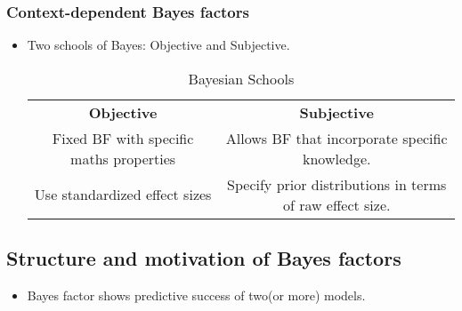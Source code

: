 \documentclass[a4paper]{article}
\begin{document}
\subsubsection{Context-dependent Bayes factors}
\begin{itemize}
    \item Two schools of Bayes: Objective and Subjective.
    \begin{table}[H]
        \centering
        \caption{Bayesian Schools}
        \label{tab:label}
        \begin{tabular}{|c|c|}
           \hline
           \textbf{Objective} & \textbf{Subjective}  \\
           Fixed BF with specific maths properties & Allows BF that incorporate specific knowledge. \\
           Use standardized effect sizes & Specify prior distributions in terms of raw effect size. \\
           \hline
        \end{tabular}
    \end{table}
\end{itemize}
\subsection{Structure and motivation of Bayes factors}
\begin{itemize}
    \item Bayes factor shows predictive success of two(or more) models.
\end{itemize}
\end{document}
